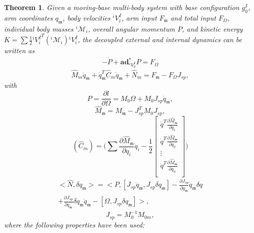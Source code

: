 \documentclass[lettersize,journal]{IEEEtran}
\newtheorem{theorem}{Theorem}
\begin{document}
\begin{theorem} Given a moving-base multi-body system with base configuration $g^I_0$, arm coordinates $q_\mathfrak{m}$, body velocities ${}^iV^I_i$, arm input $F_\mathfrak{m}$ and total input $F_\Omega$, individual body masses ${}^i\mathcal{M}_i$, overall angular momentum $P$, and kinetic energy $K=\sum \frac{1}{2} {{}^iV_i^I}^T(^i\mathcal{M}_i){}^iV_i^I$, the decoupled external and internal dynamics can be written as
\begin{align}
    -\dot{P}+\textbf{ad}^*_{^0V^I_0}P=F_{\Omega}
    \label{euler-poincare_eq}
\end{align}
\begin{equation}
    {\hat{M}_{m}\ddot{q}_\mathfrak{m}+\dot{q}_\mathfrak{m}^T\hat{C}_{m}\dot{q}_\mathfrak{m}+\hat{N}_{m}=F_\mathfrak{m}-F_{\Omega}J_{sp},}
\end{equation}
with
\begin{equation}
    P=\frac{\partial l}{\partial \Omega}=M_0 \Omega + M_0 J_{sp}\dot{q}_\mathfrak{m},
\end{equation}
\begin{equation}
    \hat{M}_\mathfrak{m}=M_\mathfrak{m}-J_{sp}^TM_0J_{sp},
\end{equation}
\begin{equation}
    {(\hat{C}_{m})=\bigg(\sum\frac{\partial \hat{M}_\mathfrak{m}}{\partial{q}_i}\dot{q}_i-\frac{1}{2}\begin{bmatrix}\dot{q}^T\frac{\partial \hat{M}_\mathfrak{m}}{\partial q_1}\\\dot{q}^T\frac{\partial \hat{M}_\mathfrak{m}}{\partial q_2}\\ \vdots\\\dot{q}^T\frac{\partial \hat{M}_\mathfrak{m}}{\partial q_n}\\\end{bmatrix}\bigg)}
\end{equation}
\begin{multline}
    <\hat{N},\delta q_\mathfrak{m}>=<P,[J_{sp}\dot{q}_\mathfrak{m},J_{sp}\delta q_\mathfrak{m}]-\frac{\partial J_{sp}}{\partial q_\mathfrak{m}}\dot{q}_\mathfrak{m}\delta q\\
    +\frac{\partial J_{sp}}{\partial q_\mathfrak{m}}\delta q_\mathfrak{m} \dot{q}_\mathfrak{m}-[\Omega,J_{sp}\delta q_\mathfrak{m}]>,
\end{multline}
\begin{equation}
  J_{sp} = M_0^{-1}M_{0m},
\end{equation}
where the following properties have been used:
\begin{equation}

\end{equation}
\end{theorem}
\end{document}
